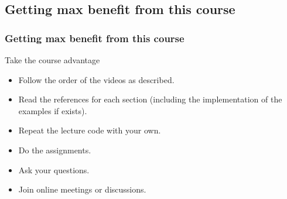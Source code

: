\subsection{Getting max benefit from this course}

\begin{frame}
\frametitle{Getting max benefit from this course}
\begin{block}{Take the course advantage}
	\begin{itemize}[<+->]
		\item Follow the order of the videos as described.
		\item Read the references for each section (including the implementation of the examples if exists). 
		\item Repeat the lecture code with your own.  
		\item Do the assignments.
		\item Ask your questions. 
		\item Join online meetings or discussions. 
	\end{itemize}
\end{block}

\end{frame}

